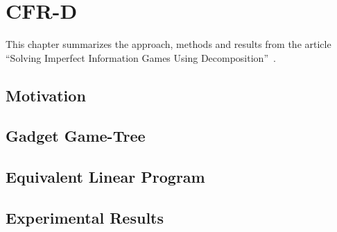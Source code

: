 \chapter{CFR-D}

This chapter summarizes the approach, methods and results from the article ``Solving Imperfect Information Games Using Decomposition''~\cite{BurchJohansonBowling13}.

\section{Motivation}

\section{Gadget Game-Tree}

\section{Equivalent Linear Program}

\section{Experimental Results}

